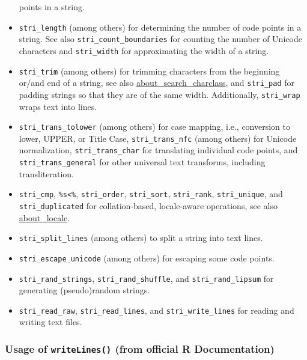 \documentclass[
]{article}
\begin{document}
\begin{itemize}
  points in a string.
\item
  \texttt{stri\_length} (among others) for determining the number of
  code points in a string. See also \texttt{stri\_count\_boundaries} for
  counting the number of Unicode characters and \texttt{stri\_width} for
  approximating the width of a string.
\item
  \texttt{stri\_trim} (among others) for trimming characters from the
  beginning or/and end of a string, see also
  \href{vscode-webview://00i87qrgljff0t3jmc9gjufilst9usetvkh9gn773om0ic67o1j2/stringi/help/about_search_charclass}{about\_search\_charclass},
  and \texttt{stri\_pad} for padding strings so that they are of the
  same width. Additionally, \texttt{stri\_wrap} wraps text into lines.
\item
  \texttt{stri\_trans\_tolower} (among others) for case mapping, i.e.,
  conversion to lower, UPPER, or Title Case, \texttt{stri\_trans\_nfc}
  (among others) for Unicode normalization, \texttt{stri\_trans\_char}
  for translating individual code points, and
  \texttt{stri\_trans\_general} for other universal text transforms,
  including transliteration.
\item
  \texttt{stri\_cmp}, \texttt{\%s\textless{}\%}, \texttt{stri\_order},
  \texttt{stri\_sort}, \texttt{stri\_rank}, \texttt{stri\_unique}, and
  \texttt{stri\_duplicated} for collation-based, locale-aware
  operations, see also
  \href{vscode-webview://00i87qrgljff0t3jmc9gjufilst9usetvkh9gn773om0ic67o1j2/stringi/help/about_locale}{about\_locale}.
\item
  \texttt{stri\_split\_lines} (among others) to split a string into text
  lines.
\item
  \texttt{stri\_escape\_unicode} (among others) for escaping some code
  points.
\item
  \texttt{stri\_rand\_strings}, \texttt{stri\_rand\_shuffle}, and
  \texttt{stri\_rand\_lipsum} for generating (pseudo)random strings.
\item
  \texttt{stri\_read\_raw}, \texttt{stri\_read\_lines}, and
  \texttt{stri\_write\_lines} for reading and writing text files.
\end{itemize}

\hypertarget{usage-of-writelines-from-official-r-documentation}{%
\subsubsection{\texorpdfstring{Usage of \texttt{writeLines()} (from
official R
Documentation)}{Usage of writeLines() (from official R Documentation)}}\label{usage-of-writelines-from-official-r-documentation}}
\end{document}

